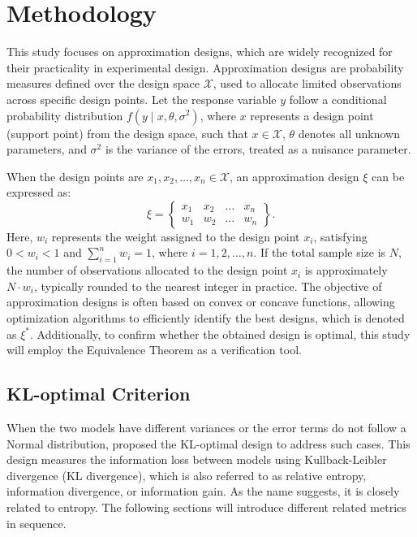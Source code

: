 \chapter{Methodology \label{CH: method}}

\hspace*{8mm} This study focuses on approximation designs, which are widely recognized for their practicality in experimental design. Approximation designs are probability measures defined over the design space $\mathcal{X}$, used to allocate limited observations across specific design points. Let the response variable $y$ follow a conditional probability distribution $f(y \mid x, \theta, \sigma^2)$, where $x$ represents a design point (support point) from the design space, such that $x \in \mathcal{X}$, $\theta$ denotes all unknown parameters, and $\sigma^2$ is the variance of the errors, treated as a nuisance parameter.

\hspace*{8mm} When the design points are $x_1, x_2, \dots, x_n \in \mathcal{X}$, an approximation design $\xi$ can be expressed as:
$$
\xi = \left\{\begin{array}{cccc}
x_1 & x_2 & \dots & x_n \\
w_1 & w_2 & \dots & w_n
\end{array}\right\}.
$$
\hspace*{8mm} Here, $w_i$ represents the weight assigned to the design point $x_i$, satisfying $0 < w_i < 1$ and $\sum_{i=1}^n w_i = 1$, where $i = 1, 2, \dots, n$. If the total sample size is $N$, the number of observations allocated to the design point $x_i$ is approximately $N \cdot w_i$, typically rounded to the nearest integer in practice. The objective of approximation designs is often based on convex or concave functions, allowing optimization algorithms to efficiently identify the best designs, which is denoted as $\xi^*$. Additionally, to confirm whether the obtained design is optimal, this study will employ the Equivalence Theorem as a verification tool.

\section{KL-optimal Criterion}

\hspace*{8mm} When the two models have different variances or the error terms do not follow a Normal distribution, \cite{lopez2007optimal} proposed the KL-optimal design to address such cases. This design measures the information loss between models using Kullback-Leibler divergence (KL divergence), which is also referred to as relative entropy, information divergence, or information gain. As the name suggests, it is closely related to entropy. The following sections will introduce different related metrics in sequence.


